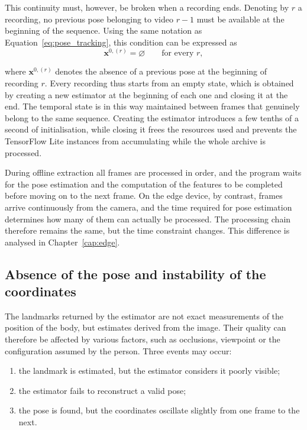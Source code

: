 This continuity must, however, be broken when a recording ends. Denoting by $r$ a recording, no previous pose belonging to video $r-1$ must be available at the beginning of the sequence. Using the same notation as Equation~\ref{eq:pose_tracking}, this condition can be expressed as
\begin{equation}
\mathbf{x}^{0,(r)} = \varnothing
\qquad \text{for every } r ,
\label{eq:azzeramento}
\end{equation}

where $\mathbf{x}^{0,(r)}$ denotes the absence of a previous pose at the beginning of recording $r$. Every recording thus starts from an empty state, which is obtained by creating a new estimator at the beginning of each one and closing it at the end. The temporal state is in this way maintained between frames that genuinely belong to the same sequence.
Creating the estimator introduces a few tenths of a second of initialisation, while closing it frees the resources used and prevents the TensorFlow Lite instances from accumulating while the whole archive is processed.

During offline extraction all frames are processed in order, and the program waits for the pose estimation and the computation of the features to be completed before moving on to the next frame.
On the edge device, by contrast, frames arrive continuously from the camera, and the time required for pose estimation determines how many of them can actually be processed.
The processing chain therefore remains the same, but the time constraint changes. This difference is analysed in Chapter~\ref{cap:edge}.

\subsection{Absence of the pose and instability of the coordinates}
\label{sec:posa-mancante}

The landmarks returned by the estimator are not exact measurements of the position of the body, but estimates derived from the image. Their quality can therefore be affected by various factors, such as occlusions, viewpoint or the configuration assumed by the person. Three events may occur:
\begin{enumerate}
    \item the landmark is estimated, but the estimator considers it poorly visible;
    \item the estimator fails to reconstruct a valid pose;
    \item the pose is found, but the coordinates oscillate slightly from one frame to the next.
\end{enumerate}

